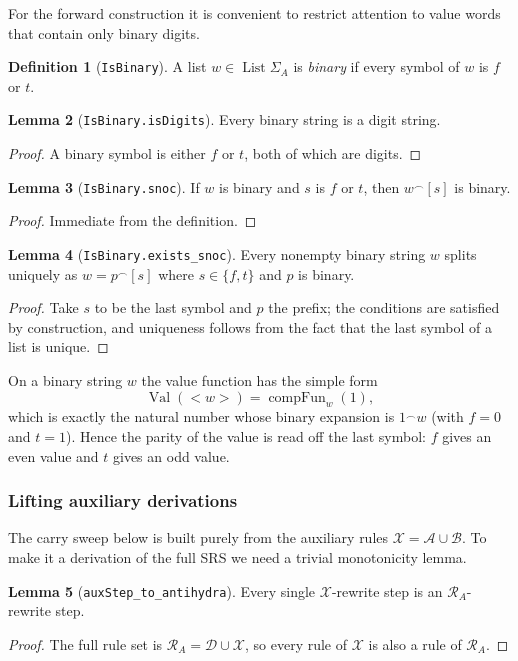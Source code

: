 \documentclass[11pt,a4paper]{article}
\theoremstyle{definition}
\newtheorem{definition}{Definition}[section]
\newtheorem{lemma}[definition]{Lemma}
\newcommand{\lt}{<}
\newcommand{\gt}{>}
\newcommand{\val}{\operatorname{Val}}
\newcommand{\List}{\operatorname{List}}
\newcommand{\conc}{{^\frown}}
\newcommand{\compFun}{\operatorname{compFun}}
\newcommand{\auxA}{\mathcal{A}}
\newcommand{\auxB}{\mathcal{B}}
\newcommand{\auxRules}{\mathcal{X}}
\newcommand{\dynRules}{\mathcal{D}}
\newcommand{\antihydraSRS}{\mathcal{R}_{A}}
\begin{document}
For the forward construction it is convenient to restrict attention to
value words that contain only binary digits.

\begin{definition}[\texttt{IsBinary}]
A list $w\in\List{\Sigma_A}$ is \emph{binary} if every symbol of $w$ is
$f$ or $t$.
\end{definition}

\begin{lemma}[\texttt{IsBinary.isDigits}]
Every binary string is a digit string.
\end{lemma}
\begin{proof}
A binary symbol is either $f$ or $t$, both of which are digits.
\end{proof}

\begin{lemma}[\texttt{IsBinary.snoc}]
If $w$ is binary and $s$ is $f$ or $t$, then $w\conc[s]$ is binary.
\end{lemma}
\begin{proof}
Immediate from the definition.
\end{proof}

\begin{lemma}[\texttt{IsBinary.exists\_snoc}]
\label{lem:binary-snoc}
Every nonempty binary string $w$ splits uniquely as $w=p\conc[s]$ where
$s\in\{f,t\}$ and $p$ is binary.
\end{lemma}
\begin{proof}
Take $s$ to be the last symbol and $p$ the prefix; the conditions are
satisfied by construction, and uniqueness follows from the fact that the
last symbol of a list is unique.
\end{proof}

On a binary string $w$ the value function has the simple form
\[
  \val(\lt w\gt)=\compFun_w(1),
\]
which is exactly the natural number whose binary expansion is
$1\conc w$ (with $f=0$ and $t=1$).  Hence the parity of the value is read
off the last symbol: $f$ gives an even value and $t$ gives an odd value.

\subsubsection{Lifting auxiliary derivations}

The carry sweep below is built purely from the auxiliary rules
$\auxRules=\auxA\cup\auxB$.  To make it a derivation of the full SRS we
need a trivial monotonicity lemma.

\begin{lemma}[\texttt{auxStep\_to\_antihydra}]
\label{lem:aux-to-full}
Every single $\auxRules$-rewrite step is an $\antihydraSRS$-rewrite step.
\end{lemma}
\begin{proof}
The full rule set is $\antihydraSRS=\dynRules\cup\auxRules$, so every
rule of $\auxRules$ is also a rule of $\antihydraSRS$.
\end{proof}
\end{document}
